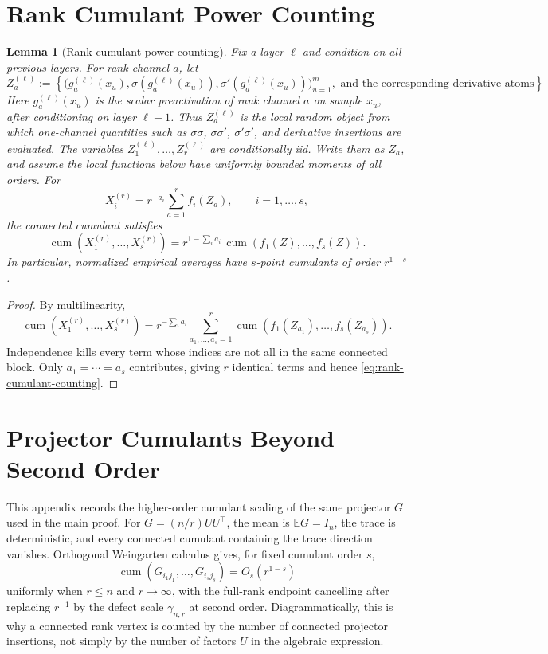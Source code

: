 \documentclass{article}
\newtheorem{lemma}[theorem]{Lemma}
\newcommand{\E}{\mathbb E}
\newcommand{\cumul}{\operatorname{cum}}
\begin{document}
\section{Rank Cumulant Power Counting}
\label{app:rank-power-counting}
\begin{lemma}[Rank cumulant power counting]
\label{lem:rank-cumulant-counting}
Fix a layer \(\ell\) and condition on all previous layers. For rank channel \(a\), let
\[
Z_a^{(\ell)}
:=
\left\{
\bigl(g_a^{(\ell)}(x_u),\sigma(g_a^{(\ell)}(x_u)),\sigma'(g_a^{(\ell)}(x_u))\bigr)_{u=1}^{m},
\text{ and the corresponding derivative atoms}
\right\}.
\]
Here \(g_a^{(\ell)}(x_u)\) is the scalar preactivation of rank channel \(a\) on sample \(x_u\), after conditioning on layer \(\ell-1\). Thus \(Z_a^{(\ell)}\) is the local random object from which one-channel quantities such as \(\sigma\sigma\), \(\sigma\sigma'\), \(\sigma'\sigma'\), and derivative insertions are evaluated. The variables \(Z_1^{(\ell)},\ldots,Z_r^{(\ell)}\) are conditionally iid. Write them as \(Z_a\), and assume the local functions below have uniformly bounded moments of all orders. For
\[
X_i^{(r)}=r^{-a_i}\sum_{a=1}^{r} f_i(Z_a),
\qquad i=1,\ldots,s,
\]
the connected cumulant satisfies
\begin{equation}
\cumul\left(X_1^{(r)},\ldots,X_s^{(r)}\right)
=r^{1-\sum_i a_i}\,
\cumul\left(f_1(Z),\ldots,f_s(Z)\right).
\label{eq:rank-cumulant-counting}
\end{equation}
In particular, normalized empirical averages have \(s\)-point cumulants of order \(r^{1-s}\).
\end{lemma}

\begin{proof}
By multilinearity,
\[
\cumul(X_1^{(r)},\ldots,X_s^{(r)})
=r^{-\sum_i a_i}
\sum_{a_1,\ldots,a_s=1}^{r}
\cumul(f_1(Z_{a_1}),\ldots,f_s(Z_{a_s})).
\]
Independence kills every term whose indices are not all in the same connected block. Only \(a_1=\cdots=a_s\) contributes, giving \(r\) identical terms and hence \eqref{eq:rank-cumulant-counting}.
\end{proof}

\section{Projector Cumulants Beyond Second Order}
This appendix records the higher-order cumulant scaling of the same projector \(G\) used in the main proof.
For \(G=(n/r)UU^\top\), the mean is \(\E G=I_n\), the trace is deterministic, and every connected cumulant containing the trace direction vanishes. Orthogonal Weingarten calculus gives, for fixed cumulant order \(s\),
\begin{equation}
\cumul(G_{i_1j_1},\ldots,G_{i_sj_s})
=O_s(r^{1-s})
\end{equation}
uniformly when \(r\le n\) and \(r\to\infty\), with the full-rank endpoint cancelling after replacing \(r^{-1}\) by the defect scale \(\gamma_{n,r}\) at second order. Diagrammatically, this is why a connected rank vertex is counted by the number of connected projector insertions, not simply by the number of factors \(U\) in the algebraic expression.
\end{document}
